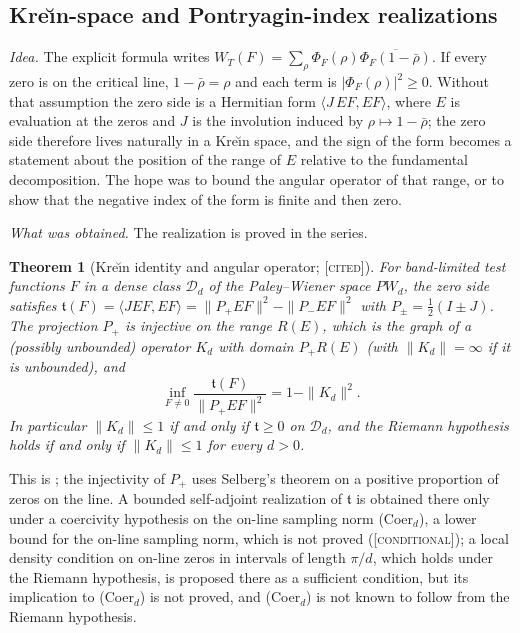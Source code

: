 \documentclass[11pt]{amsart}
\newtheorem{theorem}{Theorem}[section]
\theoremstyle{definition}
\theoremstyle{remark}
\numberwithin{equation}{section}
\newcommand{\PhiF}{\Phi_F}                             %
\newcommand{\WT}{W_T}                                  %
\newcommand{\stag}[1]{\textsc{[#1]}}
\newcommand{\CITED}{\stag{cited}}
\newcommand{\COND}{\stag{conditional}}
\newcommand{\entry}[1]{\par\smallskip\noindent\textit{#1.}\enspace}
\begin{document}
\subsection{Kre\u{\i}n-space and Pontryagin-index realizations}\label{w6:fam:R10}

\entry{Idea} The explicit formula writes $\WT(F)=\sum_\rho \PhiF(\rho)\overline{\PhiF(1-\bar\rho)}$.
If every zero is on the critical line, $1-\bar\rho=\rho$ and each term is $|\PhiF(\rho)|^2\ge0$.
Without that assumption the zero side is a Hermitian form $\langle J\,EF,EF\rangle$, where $E$ is
evaluation at the zeros and $J$ is the involution induced by $\rho\mapsto1-\bar\rho$; the zero side
therefore lives naturally in a Kre\u{\i}n space, and the sign of the form becomes a statement about
the position of the range of $E$ relative to the fundamental decomposition. The hope was to bound
the angular operator of that range, or to show that the negative index of the form is finite and
then zero.

\entry{What was obtained} The realization is proved in the series.

\begin{theorem}[Kre\u{\i}n identity and angular operator; \CITED]\label{w6:thm:krein}
For band-limited test functions $F$ in a dense class $\mathcal D_d$ of the Paley--Wiener space
$PW_d$, the zero side satisfies $\mathfrak t(F)=\langle JEF,EF\rangle=\|P_+EF\|^2-\|P_-EF\|^2$ with
$P_\pm=\frac12(I\pm J)$. The projection $P_+$ is injective on the range $R(E)$, which is the graph
of a (possibly unbounded) operator $K_d$ with domain $P_+R(E)$ (with $\|K_d\|=\infty$ if it is unbounded), and
\[
\inf_{F\neq0}\frac{\mathfrak t(F)}{\|P_+EF\|^2}=1-\|K_d\|^2 .
\]
In particular $\|K_d\|\le1$ if and only if $\mathfrak t\ge0$ on $\mathcal D_d$, and the Riemann
hypothesis holds if and only if $\|K_d\|\le1$ for every $d>0$.
\end{theorem}

This is \cite[Theorem~1.2 and Proposition~1.3]{P08}; the injectivity of $P_+$ uses Selberg's
theorem on a positive proportion of zeros on the line. A bounded self-adjoint realization of
$\mathfrak t$ is obtained there only under a coercivity hypothesis on the on-line sampling norm
(Coer$_d$), a lower bound for the on-line sampling norm, which is not proved \cite[Theorem~1.1]{P08}
(\COND); a local density condition on on-line zeros in intervals of length $\pi/d$, which holds under
the Riemann hypothesis, is proposed there as a sufficient condition, but its implication to
(Coer$_d$) is not proved, and (Coer$_d$) is not known to follow from the Riemann hypothesis.
\end{document}
